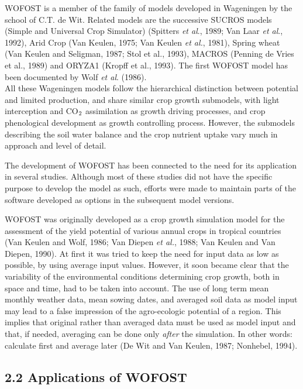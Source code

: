 \documentclass[11pt]{article}
\begin{document}
\bigskip
WOFOST is a member of the family of models developed in {\nobreak}Wageningen by the school
of C.T. de Wit. Related models are the successive SUCROS models (Simple and
Universal Crop Simu\-lator) (Spitters {\it et al\/}., 1989; Van Laar {\it et al\/}., 1992), Arid Crop (Van
Keulen, 1975; Van Keulen {\it et al.\/}, 1981), Spring wheat (Van Keulen and Seligman, 1987;
Stol et al., 1993), MACROS (Penning de Vries et al., 1989) and ORYZA1 (Kropff et al.,
1993). The first WOFOST model has been documented by Wolf {\it et al\/}. (1986). \\
 All these Wageningen models follow the hierarchical distinc\-tion between potential and
limited production, and share similar crop growth submodels, with light interception and
CO$_{{\rm 2}}$ assimilation as growth driving processes, and crop {\nobreak}phenological development as
growth controlling process. How\-ever, the submodels describing the soil water balance and
the crop nutrient uptake vary much in approach and level of {\nobreak}detail.

\bigskip
The development of WOFOST has been connected to the need for its application in
several studies. Although most of these studies did not have the specific purpose to
develop the model as such, efforts were made to maintain parts of the software developed
as options in the subsequent model versions.

\bigskip
WOFOST was originally developed as a crop growth simulation model for the assessment
of the yield potential of various annual crops in tropi\-cal countries (Van Keulen and Wolf,
1986; Van Diepen {\it et al.\/}, 1988; Van Keulen and Van Diepen, 1990). At first it was tried
to keep the need for input data as low as possible, by using average input values.
However, it soon became clear that the variability of the environmental condi\-tions
determining crop growth, both in space and time, had to be taken into account. The use
of long term mean monthly weather data, mean sowing dates, and averaged soil data as
model input may lead to a false impression of the agro-{\nobreak}ecologic potential of a region.
This implies that original rather than averaged data must be used as model input and that,
if needed, averaging can be done only {\it after\/} the simula\-tion. In other words: calculate first
and average later (De Wit and Van Keulen, 1987; Nonhebel, 1994).

\bigskip
\bigskip

\subsection{  2.2 Applications of WOFOST  }
\end{document}
